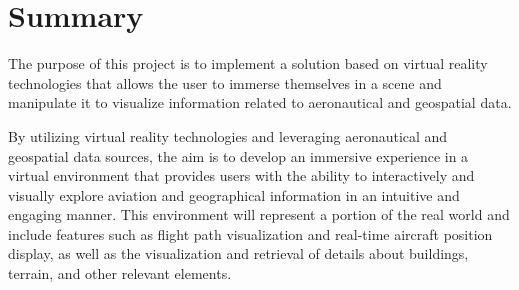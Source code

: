 \documentclass[a4paper, 11pt]{book}
\begin{document}

\chapter*{Summary}

The purpose of this project is to implement a solution based on virtual reality technologies that allows the user to immerse themselves in a scene and manipulate it to visualize information related to aeronautical and geospatial data.

By utilizing virtual reality technologies and leveraging aeronautical and geospatial data sources, the aim is to develop an immersive experience in a virtual environment that provides users with the ability to interactively and visually explore aviation and geographical information in an intuitive and engaging manner. This environment will represent a portion of the real world and include features such as flight path visualization and real-time aircraft position display, as well as the visualization and retrieval of details about buildings, terrain, and other relevant elements.




\tableofcontents 
\cleardoublepage
\listoffigures %


\end{document}
